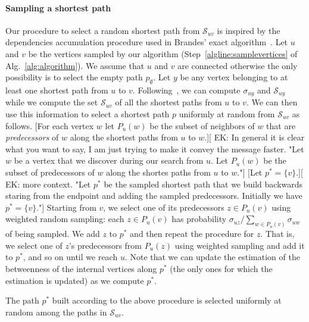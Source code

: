 \paragraph{Sampling a shortest path}
Our procedure to select a random shortest path from $\mathcal{S}_{uv}$ is
inspired by the dependencies accumulation procedure used in Brandes' exact
algorithm~\citep{Brandes01}. 
Let $u$ and $v$ be the vertices sampled by our algorithm
(Step~\ref{algline:samplevertices} of Alg.~\ref{alg:algorithm}). We assume that $u$ and
$v$ are connected otherwise the only possibility is to select the empty path
$p_\emptyset$. Let $y$ be any vertex belonging to at least one shortest path
from $u$ to $v$. Following~\citet{Brandes01}, we can compute $\sigma_{uy}$ and
$\mathcal{S}_{uy}$ while we compute the set $\mathcal{S}_{uv}$ of all the
shortest paths from $u$ to $v$. We can then use this information to select a
shortest path $p$ uniformly at random from $\mathcal{S}_{uv}$ as follows. [For each vertex
$w$ let $P_u(w)$ be the subset of neighbors of $w$ that are \emph{predecessors}
of $w$ along the shortest paths from $u$ to $w$.][ EK: In general it is clear what you want to say, I am just trying to
make it convey the message faster. "Let $w$ be a vertex that we discover during our search from $u$. Let 
$P_u(w)$ be the subset of predecessors of $w$ along the shortes paths from $u$ to $w$."] [Let $p^*=\{v\}$.][ EK:
more context. "Let $p^*$ be the sampled shortest path that we build backwards staring from the endpoint and adding 
the sampled predecessors. Initially we have $p^*=\{v\}$."] Starting from
$v$, we select one of its predecessors $z\in P_u(v)$ using weighted random
sampling: each $z\in P_u(v)$ has probability $\sigma_{uz}/\sum_{w\in
P_u(v)}\sigma_{uw}$ of being sampled. We add $z$ to $p^*$ and then repeat the
procedure for $z$. That is, we select one of $z$'s predecessors from $P_u(z)$
using weighted sampling and add it to $p^*$, and so on until we reach $u$. Note
that we can update the estimation of the betweenness of the internal vertices
along $p^*$ (the only ones for which the estimation is updated) as we compute
$p^*$.

\begin{lemma}\label{lem:samplpath}
  The path $p^*$ built according to the above procedure is selected uniformly at
  random among the paths in $\mathcal{S}_{uv}$.
\end{lemma}

